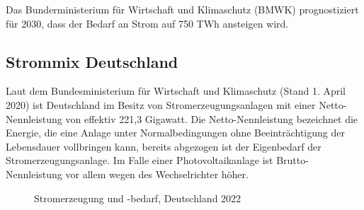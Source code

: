\documentclass[12pt, a4paper]{article}
\begin{document}
Das Bunderministerium für Wirtschaft und Klimaschutz (BMWK) prognostiziert für 2030, dass der Bedarf an Strom auf 750 TWh ansteigen wird.

\subsection{Strommix Deutschland}

Laut dem Bundesministerium für Wirtschaft und Klimaschutz (Stand 1. April 2020) ist Deutschland im Besitz von Stromerzeugungsanlagen mit einer Netto-Nennleistung von effektiv 221,3 Gigawatt. Die Netto-Nennleistung bezeichnet die Energie, die eine Anlage unter Normalbedingungen ohne Beeinträchtigung der Lebensdauer vollbringen kann, bereits abgezogen ist der Eigenbedarf der Stromerzeugungsanlage. Im Falle einer Photovoltaikanlage ist Brutto-Nennleistung vor allem wegen des Wechselrichter höher. 

\begin{figure}
\centering
\def\svgwidth{450pt}
\fontsize{7}{10}\selectfont

\caption{Stromerzeugung und -bedarf, Deutschland 2022}
\label{fig:stromerzeugung_de_2022}
\end {figure}
\end{document}
